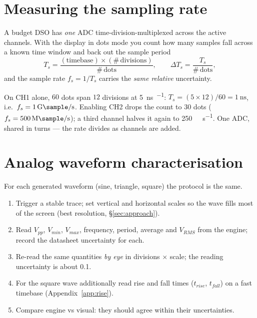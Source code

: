 \documentclass[11pt,a4paper,oneside]{book}
\begin{document}
\section{Measuring the sampling rate}

A budget DSO has \emph{one} ADC time-division-multiplexed across the active
channels. With the display in dots mode you count how many samples fall across a
known time window and back out the sample period
\[
T_s=\frac{(\text{timebase})\times(\#\,\text{divisions})}{\#\,\text{dots}},
\qquad \Delta T_s=\frac{T_s}{\#\,\text{dots}},
\]
and the sample rate $f_s=1/T_s$ carries the \emph{same relative} uncertainty.

\begin{wexample}
On CH1 alone, $60$ dots span $12$ divisions at \qty{5}{\nano\second\per\division}:
$T_s=(5\times12)/60=\qty{1}{\nano\second}$, i.e.\ $f_s=\qty{1}{\giga\sample\per
\second}$. Enabling CH2 drops the count to $30$ dots ($f_s=\qty{500}{\mega\sample
\per\second}$); a third channel halves it again to \qty{250}{\mega\sample\per
\second}. One ADC, shared in turns --- the rate divides as channels are added.
\end{wexample}

\section{Analog waveform characterisation}

For each generated waveform (sine, triangle, square)
the protocol is the same.

\begin{protocol}
\begin{enumerate}[leftmargin=1.5cm]
  \item Trigger a stable trace; set vertical and horizontal scales so the wave
        fills most of the screen (best resolution, \S\ref{sec:approach}).
  \item Read $V_{pp}$, $V_{min}$, $V_{max}$, frequency, period, average and
        $V_{RMS}$ from the engine; record the datasheet uncertainty for each.
  \item Re-read the same quantities \emph{by eye} in divisions $\times$ scale;
        the reading uncertainty is about \qty{0.1}{\division}.
  \item For the square wave additionally read rise and fall times
        ($t_{rise}$, $t_{fall}$) on a fast timebase
        (Appendix~\ref{app:rise}).
  \item Compare engine vs visual: they should agree within their uncertainties.
\end{enumerate}
\end{protocol}
\end{document}

